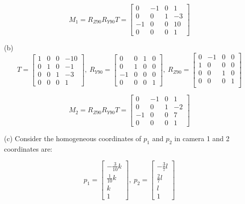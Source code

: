 \documentclass[12pt]{article}
\begin{document}
\begin{equation*}
M_1 =  R_{Z90} R_{Y90} T = \left[ \begin{array}{cccc}
0 & -1 & 0 & 1\\
0 & 0 & 1 & -3\\
-1 & 0 & 0 & 10\\
0 & 0 & 0 & 1
\end{array} \right]
\end{equation*}


\noindent (b) 
\begin{equation*}
T = \left[ \begin{array}{cccc}
1 & 0 & 0 & -10\\
0 & 1 & 0 & -1\\
0 & 0 & 1 & -3\\
0 & 0 & 0 & 1
\end{array} \right],\ R_{Y90}  = \left[ \begin{array}{cccc}
0 & 0 & 1 & 0\\
0 & 1 & 0 & 0\\
-1 & 0 & 0 & 0\\
0 & 0 & 0 & 1
\end{array} \right],\ R_{Z90}  = \left[ \begin{array}{cccc}
0 & -1 & 0 & 0\\
1 & 0 & 0 & 0\\
0 & 0 & 1 & 0\\
0 & 0 & 0 & 1\\
\end{array} \right]
\end{equation*}

\begin{equation*}
M_2 =  R_{Z90} R_{Y90} T = \left[ \begin{array}{cccc}
0 & -1 & 0 & 1\\
0 & 0 & 1 & -2\\
-1 & 0 & 0 & 7\\
0 & 0 & 0 & 1
\end{array} \right]
\end{equation*}


\noindent (c) Consider the homogeneous coordinates of $p_1$ and $p_2$ in camera 1 and 2 coordinates are:

\begin{equation*}
p_1 = \left[ \begin{array}{c}
-\frac{3}{10}k\\
\frac{1}{10}k\\
k\\
1
\end{array} \right],\ p_2 = \left[ \begin{array}{c}
-\frac{3}{7}l\\
\frac{2}{7}l\\
l\\
1
\end{array} \right]
\end{equation*}
\end{document}
